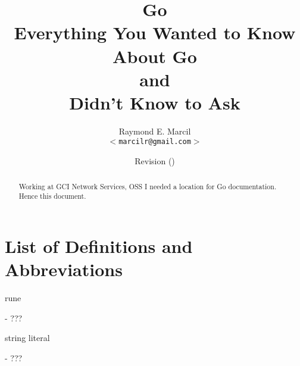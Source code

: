 \documentclass[12pt,letterpaper,dvips]{article}
\title{Go\\
  \normalsize{Everything You Wanted to Know About Go\\
  and\\
  Didn't Know to Ask}}
\author{Raymond E. Marcil\\
        \texttt{$<$marcilr@gmail.com$>$}
}
\date{Revision \svnInfoRevision
      \hspace{2pt}
      (\svnInfoLongDate)}
\newenvironment{itemize*}%
  {\begin{itemize}%
    \setlength{\itemsep}{0pt}%
    \setlength{\parsep}{0pt}}%
  {\end{itemize}}
\begin{document}
\maketitle

\begin{abstract}
  Working at GCI Network Services, OSS I needed a location for Go
  documentation. Hence this document.
\end{abstract}

\vspace{2.0in}


\newpage
\tableofcontents

\newpage
\listoffigures
\listoftables


\newpage
\setcounter{secnumdepth}{0}
\section{List of Definitions and Abbreviations}
\begin{itemize*}
    \item{\begin{bf}rune\end{bf}} - ???
    \item{\begin{bf}string literal\end{bf}} - ???

\end{itemize*}
\end{document}
